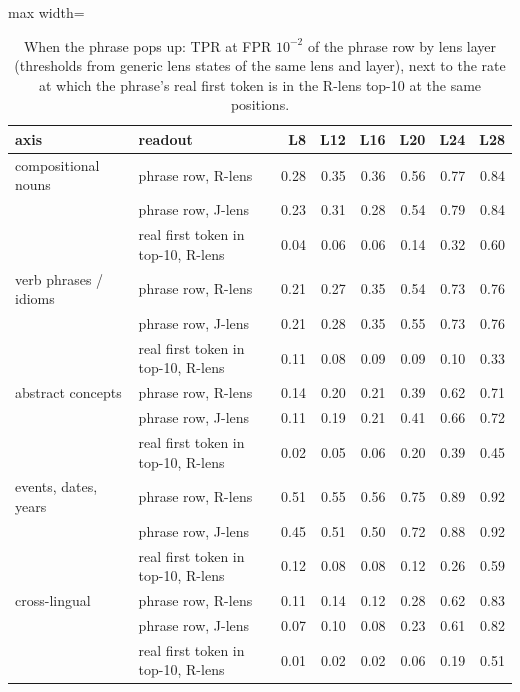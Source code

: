 \begin{table}[t]
\centering
\footnotesize
\caption{When the phrase pops up: TPR at FPR $10^{-2}$ of the phrase row by lens layer (thresholds from generic lens states of the same lens and layer), next to the rate at which the phrase's real first token is in the R-lens top-10 at the same positions.}
\label{tab:gen_layers}
\begin{adjustbox}{max width=\textwidth}
\begin{tabular}{llrrrrrr}
\toprule
axis & readout & L8 & L12 & L16 & L20 & L24 & L28 \\
\midrule
compositional nouns & phrase row, R-lens & 0.28 & 0.35 & 0.36 & 0.56 & 0.77 & 0.84 \\
 & phrase row, J-lens & 0.23 & 0.31 & 0.28 & 0.54 & 0.79 & 0.84 \\
 & real first token in top-10, R-lens & 0.04 & 0.06 & 0.06 & 0.14 & 0.32 & 0.60 \\
\midrule
verb phrases / idioms & phrase row, R-lens & 0.21 & 0.27 & 0.35 & 0.54 & 0.73 & 0.76 \\
 & phrase row, J-lens & 0.21 & 0.28 & 0.35 & 0.55 & 0.73 & 0.76 \\
 & real first token in top-10, R-lens & 0.11 & 0.08 & 0.09 & 0.09 & 0.10 & 0.33 \\
\midrule
abstract concepts & phrase row, R-lens & 0.14 & 0.20 & 0.21 & 0.39 & 0.62 & 0.71 \\
 & phrase row, J-lens & 0.11 & 0.19 & 0.21 & 0.41 & 0.66 & 0.72 \\
 & real first token in top-10, R-lens & 0.02 & 0.05 & 0.06 & 0.20 & 0.39 & 0.45 \\
\midrule
events, dates, years & phrase row, R-lens & 0.51 & 0.55 & 0.56 & 0.75 & 0.89 & 0.92 \\
 & phrase row, J-lens & 0.45 & 0.51 & 0.50 & 0.72 & 0.88 & 0.92 \\
 & real first token in top-10, R-lens & 0.12 & 0.08 & 0.08 & 0.12 & 0.26 & 0.59 \\
\midrule
cross-lingual & phrase row, R-lens & 0.11 & 0.14 & 0.12 & 0.28 & 0.62 & 0.83 \\
 & phrase row, J-lens & 0.07 & 0.10 & 0.08 & 0.23 & 0.61 & 0.82 \\
 & real first token in top-10, R-lens & 0.01 & 0.02 & 0.02 & 0.06 & 0.19 & 0.51 \\
\bottomrule
\end{tabular}
\end{adjustbox}
\end{table}